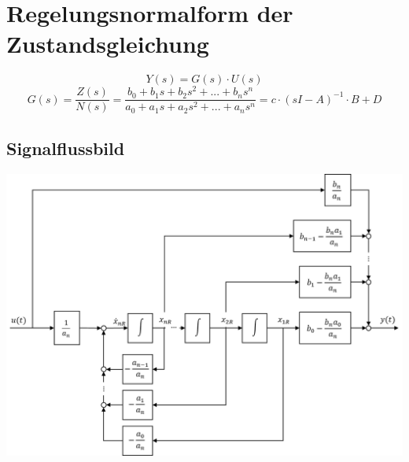 



\section{Regelungsnormalform der Zustandsgleichung}
\[
	Y(s) = G(s) \cdot U(s)
\]
\[
	G(s)= \frac{Z(s)}{N(s)} = \frac{b_0+b_1s+b_2s^2+...+b_ns^n}{a_0+a_1s+a_2s^2+...+a_ns^n}=c\cdot(sI-A)^{-1}\cdot B +D
\]
\subsection{Signalflussbild}
\begin{center}
	\includegraphics[scale = 0.5]{images/RNF_Signalflussblid.png}
\end{center}

